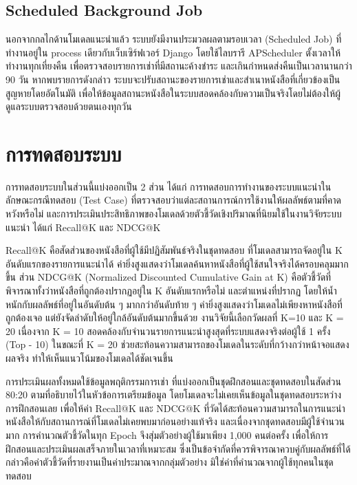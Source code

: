 \subsection{Scheduled Background Job}

นอกจากกลไกด้านโมเดลแนะนำแล้ว ระบบยังมีงานประมวลผลตามรอบเวลา (Scheduled Job) ที่ทำงานอยู่ใน process เดียวกับเว็บเซิร์ฟเวอร์ Django โดยใช้ไลบรารี APScheduler ตั้งเวลาให้ทำงานทุกเที่ยงคืน เพื่อตรวจสอบรายการเช่าที่มีสถานะค้างชำระ และเกินกำหนดส่งคืนเป็นเวลานานกว่า 90 วัน หากพบรายการดังกล่าว ระบบจะปรับสถานะของรายการเช่าและสำเนาหนังสือที่เกี่ยวข้องเป็นสูญหายโดยอัตโนมัติ เพื่อให้ข้อมูลสถานะหนังสือในระบบสอดคล้องกับความเป็นจริงโดยไม่ต้องให้ผู้ดูแลระบบตรวจสอบด้วยตนเองทุกวัน

\section{การทดสอบระบบ}

การทดสอบระบบในส่วนนี้แบ่งออกเป็น 2 ส่วน ได้แก่ การทดสอบการทำงานของระบบแนะนำในลักษณะกรณีทดสอบ (Test Case) ที่ตรวจสอบว่าแต่ละสถานการณ์การใช้งานให้ผลลัพธ์ตามที่คาดหวังหรือไม่ และการประเมินประสิทธิภาพของโมเดลด้วยตัวชี้วัดเชิงปริมาณที่นิยมใช้ในงานวิจัยระบบแนะนำ ได้แก่ Recall@K และ NDCG@K

Recall@K คือสัดส่วนของหนังสือที่ผู้ใช้มีปฏิสัมพันธ์จริงในชุดทดสอบ ที่โมเดลสามารถจัดอยู่ใน K อันดับแรกของรายการแนะนำได้ ค่ายิ่งสูงแสดงว่าโมเดลค้นหาหนังสือที่ผู้ใช้สนใจจริงได้ครอบคลุมมากขึ้น ส่วน NDCG@K (Normalized Discounted Cumulative Gain at K) คือตัวชี้วัดที่พิจารณาทั้งว่าหนังสือที่ถูกต้องปรากฏอยู่ใน K อันดับแรกหรือไม่ และตำแหน่งที่ปรากฏ โดยให้น้ำหนักกับผลลัพธ์ที่อยู่ในอันดับต้น ๆ มากกว่าอันดับท้าย ๆ ค่ายิ่งสูงแสดงว่าโมเดลไม่เพียงหาหนังสือที่ถูกต้องเจอ แต่ยังจัดลำดับให้อยู่ใกล้อันดับต้นมากขึ้นด้วย งานวิจัยนี้เลือกวัดผลที่ K=10 และ K = 20 เนื่องจาก K = 10 สอดคล้องกับจำนวนรายการแนะนำสูงสุดที่ระบบแสดงจริงต่อผู้ใช้ 1 ครั้ง (Top - 10) ในขณะที่ K = 20 ช่วยสะท้อนความสามารถของโมเดลในระดับที่กว้างกว่าหน้าจอแสดงผลจริง ทำให้เห็นแนวโน้มของโมเดลได้ชัดเจนขึ้น

การประเมินผลทั้งหมดใช้ข้อมูลพฤติกรรมการเช่า ที่แบ่งออกเป็นชุดฝึกสอนและชุดทดสอบในสัดส่วน 80:20 ตามที่อธิบายไว้ในหัวข้อการเตรียมข้อมูล โดยโมเดลจะไม่เคยเห็นข้อมูลในชุดทดสอบระหว่างการฝึกสอนเลย เพื่อให้ค่า Recall@K และ NDCG@K ที่วัดได้สะท้อนความสามารถในการแนะนำหนังสือให้กับสถานการณ์ที่โมเดลไม่เคยพบมาก่อนอย่างแท้จริง และเนื่องจากชุดทดสอบมีผู้ใช้จำนวนมาก การคำนวณตัวชี้วัดในทุก Epoch จึงสุ่มตัวอย่างผู้ใช้มาเพียง 1,000 คนต่อครั้ง เพื่อให้การฝึกสอนและประเมินผลเสร็จภายในเวลาที่เหมาะสม ซึ่งเป็นข้อจำกัดที่ควรพิจารณาควบคู่กับผลลัพธ์ที่ได้ กล่าวคือค่าตัวชี้วัดที่รายงานเป็นค่าประมาณจากกลุ่มตัวอย่าง มิใช่ค่าที่คำนวณจากผู้ใช้ทุกคนในชุดทดสอบ

